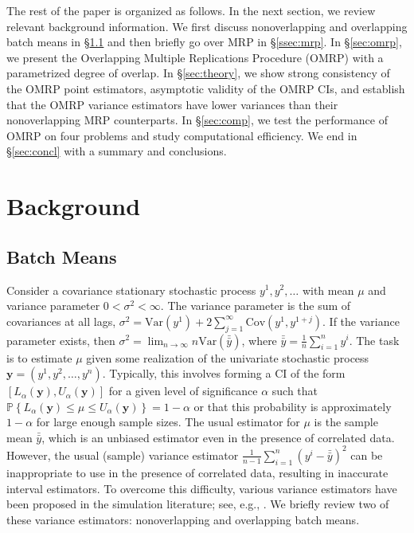 \documentclass[12pt]{article}
\newcommand{\p}[1]{\mathbb{P} \left\{ #1 \right\}}
\newcommand{\y}{\mathbf{y}}
\newcommand{\yb}{\bar{y}}
\newcommand{\ybb}{\bar{\yb}}
\begin{document}
The rest of the paper is organized as follows.  
In the next section, we review relevant background information.  
We first discuss nonoverlapping and overlapping batch means in \S \ref{ssec:obm} and then briefly go over MRP in \S \ref{ssec:mrp}.  
In \S \ref{sec:omrp}, we present the Overlapping Multiple Replications Procedure (OMRP) with a parametrized degree of overlap.  
In \S \ref{sec:theory}, we show strong consistency of the OMRP point estimators, asymptotic validity of the OMRP CIs, and establish that the OMRP variance estimators have lower variances than their nonoverlapping MRP counterparts.
In \S \ref{sec:comp}, we test the performance of OMRP on four problems and study computational efficiency. 
We end in \S \ref{sec:concl} with a summary and conclusions.


\section{Background}
\label{sec:background}


\subsection{Batch Means} 
\label{ssec:obm}

Consider a covariance stationary stochastic process $y^1, y^2, \dots$ with mean $\mu$ and variance parameter $0<\sigma^2<\infty$.  
The variance parameter is the sum of covariances at all lags, $\sigma^2=\mathrm{Var} \left(y^1 \right)+2\sum_{j=1}^{\infty}\mathrm{Cov} \left(y^1,y^{1+j}\right)$. 
If the variance parameter exists, then  $\sigma^2=\lim_{n\rightarrow \infty}n\mathrm{Var} \left(\ybb\right)$, where $\ybb=\frac{1}{n}\sum_{i=1}^{n} y^{i}$.
The task is to estimate $\mu$ given some realization of the univariate stochastic process $\y = (y^1, y^2, \dots, y^n)$.  
Typically, this involves forming a CI of the form $[L_\alpha(\y), U_\alpha(\y)]$ for a given level of significance $\alpha$ such that $\p{L_\alpha(\y) \leq \mu \leq U_\alpha(\y)} = 1 - \alpha$ or that this probability is approximately $1 - \alpha$ for large enough sample sizes.  
The usual estimator for $\mu$ is the sample mean $\ybb$, which is an unbiased estimator even in the presence of correlated data.  
However, the usual (sample) variance estimator $\frac{1}{n-1} \sum_{i=1}^n (y^i - \ybb)^2$ can be inappropriate to use in the presence of correlated data, resulting in inaccurate interval estimators.  
To overcome this difficulty, various variance estimators have been proposed in the simulation literature; see, e.g., \cite{law_15}.  
We briefly review two of these variance estimators: nonoverlapping and overlapping batch means.
\end{document}
